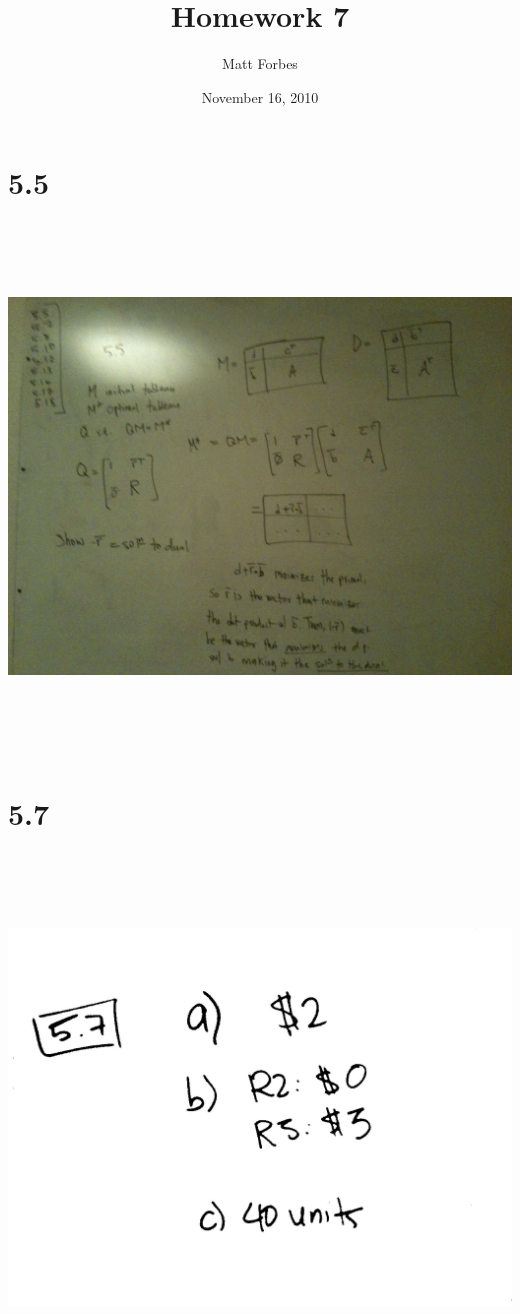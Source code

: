 \documentclass[a4paper,12pt]{article}
\begin{document}
\title{Homework 7}
\author{Matt Forbes}
\date{November 16, 2010}
\maketitle
\section*{5.5}
\includegraphics[width=14cm, height=14cm, keepaspectratio=true]{image/fivefive.jpg}
\section*{5.7}
\includegraphics[width=14cm, height=14cm, keepaspectratio=true]{image/fiveseven.jpg}
\end{document}
